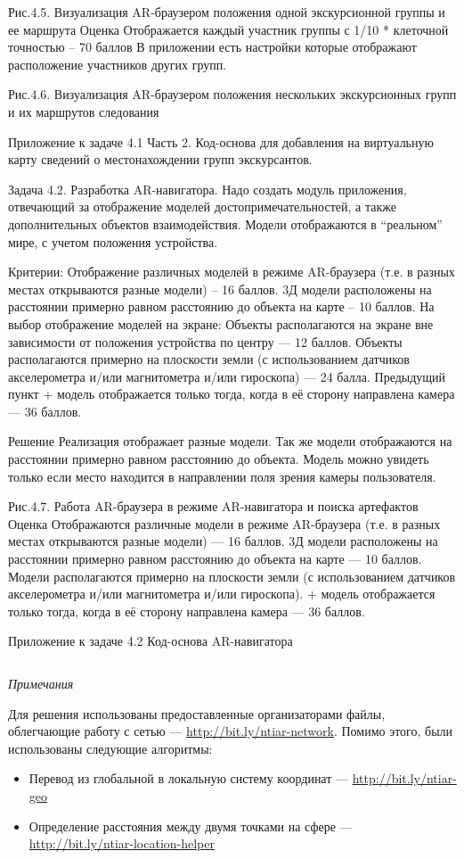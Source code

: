 

Рис.4.5. Визуализация AR-браузером положения одной экскурсионной группы и ее маршрута
Оценка
Отображается каждый участник группы с 1/10 * клеточной точностью – 70 баллов
В приложении есть настройки которые отображают расположение участников других групп.



Рис.4.6. Визуализация AR-браузером положения нескольких экскурсионных групп и их   маршрутов следования 

Приложение к задаче 4.1 Часть 2. Код-основа для добавления на виртуальную карту сведений о местонахождении групп экскурсантов.


Задача 4.2. Разработка AR-навигатора.
Надо создать модуль приложения, отвечающий за отображение моделей достопримечательностей, а также дополнительных объектов взаимодействия. Модели отображаются в “реальном” мире, с учетом положения устройства.

Критерии:
Отображение различных моделей в режиме AR-браузера (т.е. в разных местах открываются разные модели) – 16 баллов.
3Д модели расположены на расстоянии примерно равном расстоянию до объекта на карте – 10 баллов.
На выбор отображение моделей на экране:
Объекты располагаются на экране вне зависимости от положения устройства по центру — 12 баллов.
Объекты располагаются примерно на плоскости земли (с использованием датчиков акселерометра и/или магнитометра и/или гироскопа) — 24 балла.
Предыдущий пункт + модель отображается только тогда, когда в её сторону направлена камера — 36 баллов.

Решение
Реализация отображает разные модели. Так же модели отображаются на расстоянии примерно равном расстоянию до объекта. 
Модель можно увидеть только если место находится в направлении поля зрения камеры пользователя.



Рис.4.7. Работа AR-браузера в режиме AR-навигатора и поиска артефактов
Оценка
Отображаются различные модели в режиме AR-браузера (т.е. в разных местах открываются разные модели) — 16 баллов.
3Д модели расположены на расстоянии примерно равном расстоянию до объекта на карте — 10 баллов.
Модели располагаются примерно на плоскости земли (с использованием датчиков акселерометра и/или магнитометра и/или гироскопа). + модель отображается только тогда, когда в её сторону направлена камера — 36 баллов.

Приложение к задаче 4.2 Код-основа AR-навигатора

\inputminted[fontsize=\footnotesize, linenos]{csharp}{final/command_tour/ar/task_04/source3.cs}


\textit{Примечания}

Для решения использованы предоставленные организаторами файлы, облегчающие работу с сетью — \url{http://bit.ly/ntiar-network}. Помимо этого, были использованы следующие алгоритмы:
\begin{itemize}
    \item Перевод из глобальной в локальную систему координат — \url{http://bit.ly/ntiar-geo}
    \item Определение расстояния между двумя точками на сфере — \url{http://bit.ly/ntiar-location-helper}
\end{itemize}